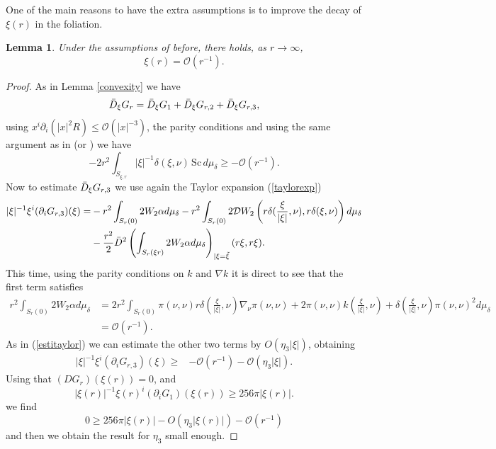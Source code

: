 \documentclass[12pt,a4paper]{amsart}
\theoremstyle{plain}
\newtheorem{lemma}[theorem]{Lemma}
\theoremstyle{definition}
\begin{document}
One of the main reasons to have the extra assumptions is to improve the decay of $\xi(r)$ in the foliation.
\begin{lemma}\label{extixi}
   Under the assumptions of before, there holds, as \(r \to \infty\),
\[
\xi(r) = \mathcal{O} (r^{-1}).
\]
\end{lemma}
\begin{proof}
As in Lemma \ref{convexity} we have 
\begin{equation}
    \Bar{D}_\xi G_r = \Bar{D}_\xi G_1 + \Bar{D}_\xi G_{r,2}+\Bar{D}_\xi G_{r,3}, 
\end{equation}
 using $ x^i \partial_i (|x|^2 R) \leq \mathcal{O}( |x|^{-3})$, the parity conditions and using the same argument as in \cite[Lemma 11]{willcen} (or \cite[Lemma 24]{eichko}) we have 
\begin{equation}
   -2 r^2 \int_{S_{\xi,r}} |\xi|^{-1} \delta( \xi, \nu ) \,\mathrm{Sc} \, d\mu_{\delta} \geq  - \mathcal{O} (r^{-1}). 
\end{equation}
Now to estimate $\Bar{D}_\xi G_{r,3} $ we use again the Taylor expansion (\ref{taylorexp}) 
\begin{equation}
\begin{split}
  |\xi|^{-1} \xi^i (\partial_i G_{r,3})(\xi) =& -r^2 \int_{S_{r}(0)}   2 W_2 \alpha d\mu_{\delta} -  r^2\int_{S_{r}(0)}   2 \mathcal{D}W_2\left(r \delta( \frac{\xi}{|\xi|}, \nu ), r \delta( \xi, \nu ) \right) d\mu_{\delta} \\
 &- \frac{r^2}{2} \Bar{D}^2 \left(\int_{S_{r}(\xi r)}  2 W_2 \alpha d\mu_{\delta}\right)_{|\xi = \Tilde{\xi}}(r \xi, r \xi).\\
 \end{split}
\end{equation}
This time, using the parity conditions on $k$ and $\nabla k$ it is direct to see that the first term satisfies 
\begin{equation*}
\begin{split}
 r^2 \int_{S_{r}(0)}   2 W_2 \alpha d\mu_{\delta}   &= 2r^2 \int_{S_r(0)}  \pi(\nu, \nu) r \delta( \frac{\xi}{|\xi|}, \nu ) \nabla_{\nu}\pi(\nu,\nu) +2 \pi(\nu, \nu)    k( \frac{\xi}{|\xi|} , \nu )+  \delta( \frac{\xi}{|\xi|}, \nu )  \pi(\nu, \nu)^2  d\mu_{\delta}\\
 &=\mathcal{O} (r^{-1}).
 \end{split}
\end{equation*}
 As in (\ref{estitaylor}) we can estimate the other two terms by $O( \eta_3 |\xi|)  $, obtaining 
 \begin{equation}
\begin{split}
    |\xi|^{-1} \xi^i (\partial_i G_{r,3})(\xi) \geq& -\mathcal{O}(r^{-1}) -\mathcal{O}(\eta_3 |\xi|).
   \end{split}
\end{equation}
 Using that \((DG_{r})(\xi(r)) = 0\), and
\[
|\xi(r)|^{-1}  \xi(r)^i (\partial_i G_1)(\xi(r)) \geq 256 \pi |\xi(r)|.
\]
 we find   
 \begin{equation}
     0 \geq 256 \pi |\xi(r)| - O( \eta_3  |\xi(r)|) - \mathcal{O} (r^{-1}) 
 \end{equation}
and then we obtain the result for $\eta_3$ small enough.
\end{proof}
\end{document}
